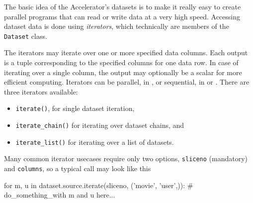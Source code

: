 
\label{chap:iterators}

The basic idea of the Accelerator's datasets is to make it really easy
to create parallel programs that can read or write data at a very high
speed.  Accessing dataset data is done using \textsl{iterators}, which
technically are members of the \texttt{Dataset} class.

The iterators may iterate over one or more specified data columns.
Each output is a tuple corresponding to the specified columns for one
data row.  In case of iterating over a single column, the output may
optionally be a scalar for more efficient computing.  Iterators can be
parallel, in \analysis, or sequential, in \prepare or \synthesis.
There are three iterators available:
\begin{itemize}
\item [] \texttt{iterate()}, for single dataset iteration,
\item [] \texttt{iterate\_chain()} for iterating over dataset chains, and
\item [] \texttt{iterate\_list()} for iterating over a list of datasets.
\end{itemize}
Many common iterator usecases require only two
options, \texttt{sliceno} (mandatory) and \texttt{columns}, so a typical call may look like this
\begin{python}
for m, u in dataset.source.iterate(sliceno, ('movie', 'user',)):
    # do_something_with m and u here...
\end{python}

